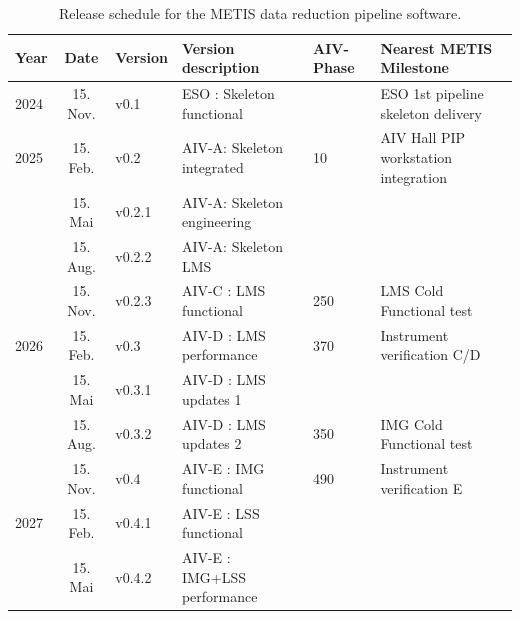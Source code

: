 \documentclass[a4paper]{spie}  %
\begin{document}
\begin{table}[]
\caption{Release schedule for the METIS data reduction pipeline software.}
\label{tab:pip_releases}
\begin{tabular}{|lcllll|}
\hline
Year & Date & Version & Version description & AIV-Phase & Nearest METIS Milestone          \\
\hline
\hline
{2024}          & 15. Nov.      & v0.1             & ESO : Skeleton functional      &                                        & ESO 1st pipeline skeleton delivery   \\
\hline
{2025}          & 15. Feb.      & v0.2             & AIV-A: Skeleton integrated    & 10                 & AIV Hall PIP workstation integration \\
                                  & 15. Mai       & v0.2.1           & AIV-A: Skeleton engineering  &                                        &                                      \\
                                  & 15. Aug.      & v0.2.2           & AIV-A: Skeleton LMS           &                                        &                                      \\
                                  & 15. Nov.      & v0.2.3           & AIV-C : LMS functional       & {250}                & LMS Cold Functional test             \\
\hline
{2026}          & 15. Feb.      & v0.3             & AIV-D : LMS performance       & {370}                & Instrument verification C/D          \\
                                  & 15. Mai       & v0.3.1           & AIV-D : LMS updates 1         &                                        &                                      \\
                                  & 15. Aug.      & v0.3.2           & AIV-D : LMS updates 2        & {350}                & IMG Cold Functional test             \\
                                  & 15. Nov.      & v0.4             & AIV-E : IMG functional         & {490}                & Instrument verification E            \\
\hline
{2027}          & 15. Feb.      & v0.4.1           & AIV-E : LSS functional      &                                        &                                      \\
                                  & 15. Mai       & v0.4.2           & AIV-E : IMG+LSS performance   &                                        &                                      \\

\end{tabular}
\end{table}
\end{document}
